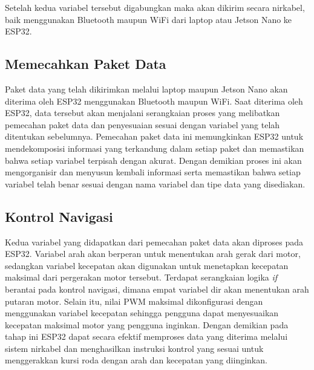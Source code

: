 Setelah kedua variabel tersebut digabungkan maka akan dikirim secara nirkabel, baik menggunakan Bluetooth maupun WiFi dari laptop atau Jetson Nano ke ESP32.

\subsection{Memecahkan Paket Data}
Paket data yang telah dikirimkan melalui laptop maupun Jetson Nano akan diterima oleh ESP32 menggunakan Bluetooth maupun WiFi. Saat diterima oleh ESP32, data tersebut akan menjalani serangkaian proses yang melibatkan pemecahan paket data dan penyesuaian sesuai dengan variabel yang telah ditentukan sebelumnya. Pemecahan paket data ini memungkinkan ESP32 untuk mendekomposisi informasi yang terkandung dalam setiap paket dan memastikan bahwa setiap variabel terpisah dengan akurat. Dengan demikian proses ini akan mengorganisir dan menyusun kembali informasi serta memastikan bahwa setiap variabel telah benar sesuai dengan nama variabel dan tipe data yang disediakan.

\subsection{Kontrol Navigasi}
Kedua variabel yang didapatkan dari pemecahan paket data akan diproses pada ESP32. Variabel arah akan berperan untuk menentukan arah gerak dari motor, sedangkan variabel kecepatan akan digunakan untuk menetapkan kecepatan maksimal dari pergerakan motor tersebut. Terdapat serangkaian logika \emph{if} berantai pada kontrol navigasi, dimana empat variabel dir akan menentukan arah putaran motor. Selain itu, nilai PWM maksimal dikonfigurasi dengan menggunakan variabel kecepatan sehingga pengguna dapat menyesuaikan kecepatan maksimal motor yang pengguna inginkan. Dengan demikian pada tahap ini ESP32 dapat secara efektif memproses data yang diterima melalui sistem nirkabel dan menghasilkan instruksi kontrol yang sesuai untuk menggerakkan kursi roda dengan arah dan kecepatan yang diinginkan.